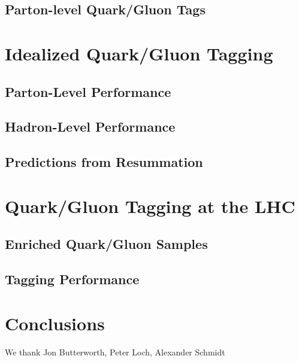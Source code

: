 \documentclass[11pt,letterpaper]{article}
\begin{document}
\subsection{Parton-level Quark/Gluon Tags}

\section{Idealized Quark/Gluon Tagging}
\label{sec:ee}

\subsection{Parton-Level Performance}

\subsection{Hadron-Level Performance}

\subsection{Predictions from Resummation}

\section{Quark/Gluon Tagging at the LHC}
\label{sec:pp}

\subsection{Enriched Quark/Gluon Samples}

\subsection{Tagging Performance}


\section{Conclusions}
\label{sec:conclude}




\begin{acknowledgments}
We thank Jon Butterworth, Peter Loch, Alexander Schmidt

\end{acknowledgments}




\end{document}

